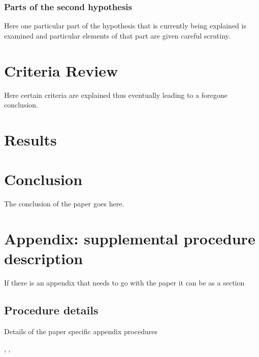\subsubsection{Parts of the second hypothesis}

Here one particular part of the hypothesis that is 
currently being explained is examined and particular
elements of that part are given careful scrutiny.

\section{Criteria Review}

Here certain criteria are explained thus eventually
leading to a foregone conclusion.

\section{Results}

\section{Conclusion}\label{conclusion3}

The conclusion of the paper goes here.

\section{Appendix: supplemental procedure description}
If there is an appendix that needs to go with the paper it can be as a section

\subsection{Procedure details}
Details of the paper specific appendix procedures

\cite{Rad87}
\cite{MOR91}, \cite{Lom73} 
\cite{Lom91}, \cite{Lom92} 
\cite{dB59}


\begingroup
    \setlength{\bibsep}{13.2pt}
    \linespread{1}\selectfont
    
\endgroup
\clearpage
\pagebreak